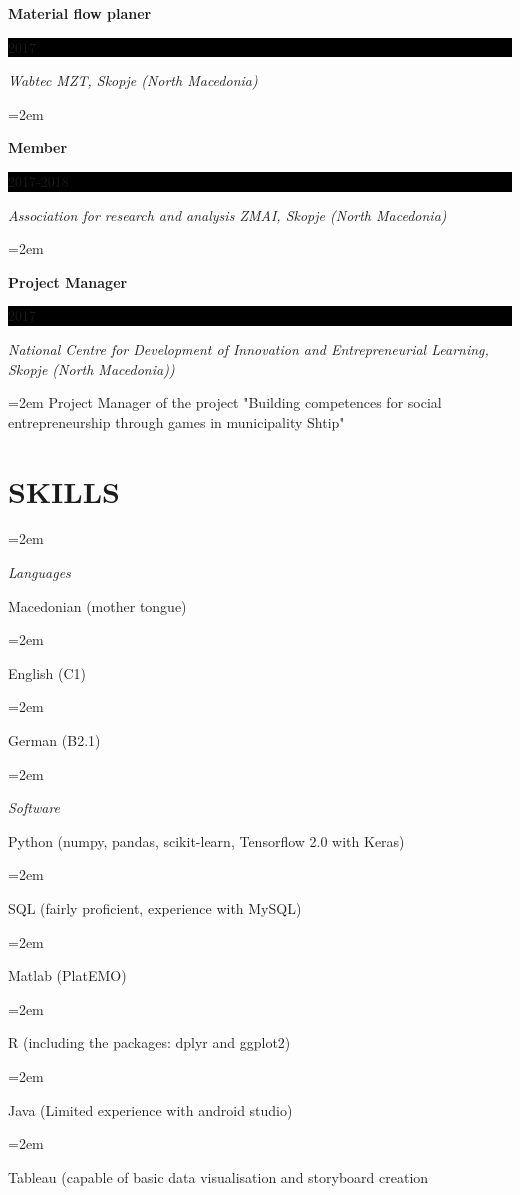 \documentclass[paper=a4,fontsize=11pt]{scrartcl} %
\newlength{\spacebox}
\newcommand{\sepspace}{\vspace*{1em}}		%
\newcommand{\NewPart}[1]{\section*{\uppercase{#1}}}
\newcommand{\PersonalEntry}[2]{
		\noindent\hangindent=2em\hangafter=0 %
		\parbox{\spacebox}{        %
		\textit{#1}}		       %
		\hspace{1.5em} #2 \par}    %
\newcommand{\SkillsEntry}[2]{      %
		\noindent\hangindent=2em\hangafter=0 %
		\parbox{\spacebox}{        %
		\textit{#1}}			   %
		\hspace{1.5em} #2 \par}    %
\newcommand{\EducationEntry}[4]{
		\noindent \textbf{#1} \hfill      %
		\colorbox{Black}{%
			\parbox{6em}{%
			\hfill\color{White}#2}} \par  %
		\noindent \textit{#3} \par        %
		\noindent\hangindent=2em\hangafter=0 \small #4 %
		\normalsize \par}
\begin{document}
\EducationEntry{Material flow planer}{2017}{Wabtec MZT, Skopje (North Macedonia)}{}
\sepspace

\EducationEntry{Member}{2017-2018}{Association for research and analysis ZMAI, Skopje (North Macedonia)}{}
\sepspace

\EducationEntry{Project Manager}{2017}{National Centre for Development of Innovation and Entrepreneurial Learning, Skopje
(North Macedonia))}{Project Manager of the project "Building competences for social entrepreneurship through
games in municipality Shtip"}
\sepspace


\NewPart{Skills}{}

\SkillsEntry{Languages}{Macedonian (mother tongue)}
\SkillsEntry{}{English (C1)}
\SkillsEntry{}{German (B2.1)}
\sepspace
\SkillsEntry{Software}{Python (numpy, pandas, scikit-learn, Tensorflow 2.0 with Keras)}
\SkillsEntry{}{SQL (fairly proficient, experience with MySQL)}
\SkillsEntry{}{Matlab (PlatEMO)}
\SkillsEntry{}{R (including the packages: dplyr and ggplot2)}
\SkillsEntry{}{Java (Limited experience with android studio)}
\SkillsEntry{}{Tableau (capable of basic data visualisation and storyboard creation}


\end{document}
